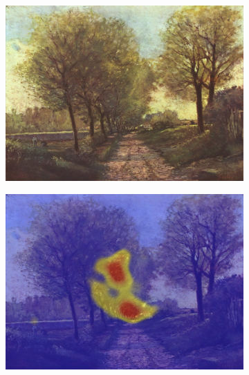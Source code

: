 \begin{figure}[!ht]
    \centering
    \begin{subfigure}{.3\textwidth}
        \includegraphics[width=\linewidth]{datas/fondu_00.jpg}
        \caption{}
    \end{subfigure}
    \begin{subfigure}{.3\textwidth}
        \includegraphics[width=\linewidth]{datas/fondu_02.jpg}
        \caption{}
    \end{subfigure}
    \begin{subfigure}{.3\textwidth}

\end{subfigure}
\end{figure}
